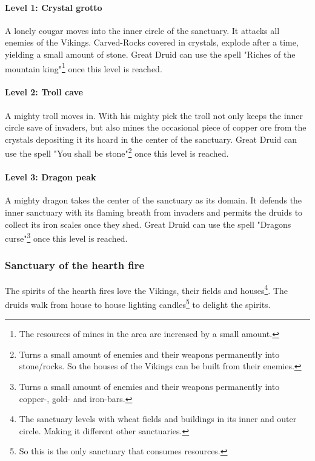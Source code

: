 \documentclass[a4paper]{article}
\begin{document}
			\paragraph{Level 1: Crystal grotto}
				A lonely cougar moves into the inner circle of the sanctuary.
				It attacks all enemies of the \gls{Vikings}.
				Carved-Rocks covered in crystals, explode after a time,
				yielding a small amount of stone.
				Great Druid can use the spell "Riches of the mountain king"\footnote{
					The resources of mines in the area are increased by a small amount.
				} once this level is reached.

			\paragraph{Level 2: Troll cave}
				A mighty troll moves in.
				With his mighty pick the troll not only keeps the inner circle save of invaders,
				but also mines the occasional piece of copper ore from the crystals depositing it its hoard
				in the center of the sanctuary.
				Great Druid can use the spell "You shall be stone"\footnote{
					Turns a small amount of enemies and their weapons permanently into stone/rocks.
					So the houses of the \gls{Vikings} can be built from their enemies.
				} once this level is reached.

			\paragraph{Level 3: Dragon peak}
				A mighty dragon takes the center of the sanctuary as its domain.
				It defends the inner sanctuary with its flaming breath from invaders
				and permits the druids to collect its iron scales once they shed.
				Great Druid can use the spell "Dragons curse"\footnote{
					Turns a small amount of enemies and their weapons permanently into copper-, gold- and iron-bars.
				} once this level is reached.

		\subsubsection{Sanctuary of the hearth fire}
			The spirits of the hearth fires love the \gls{Vikings}, their fields and houses\footnote{
				The sanctuary levels with wheat fields and buildings in its inner and outer circle.
				Making it different other sanctuaries.
			}.
			The druids walk from house to house lighting candles\footnote{
				So this is the only sanctuary that consumes resources.
			} to delight the spirits.
\end{document}
